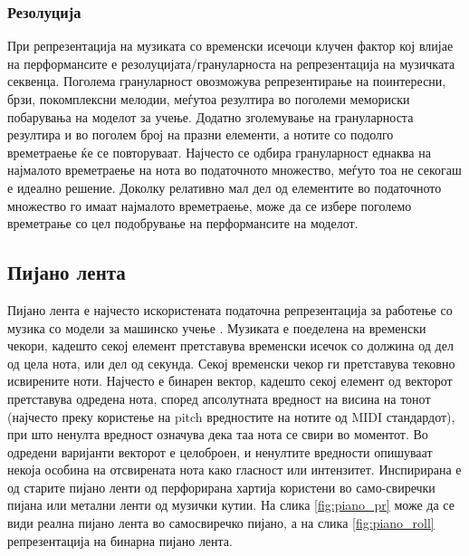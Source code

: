 \subsubsection{Резолуција}

При репрезентација на музиката со временски исечоци клучен фактор кој влијае на перформансите е резолуцијата/грануларноста на репрезентација на музичката секвенца. Поголема грануларност овозможува репрезентирање на поинтересни, брзи, покомплексни мелодии, меѓутоа резултира во поголеми мемориски побарувања на моделот за учење. Додатно зголемување на грануларноста резултира и во поголем број на празни елементи, а нотите со подолго времетраење ќе се повторуваат. Најчесто се одбира грануларност еднаква на најмалото времетраење на нота во податочното множество, меѓуто тоа не секогаш е идеално решение. Доколку релативно мал дел од елементите во податочното множество го имаат најмалото времетраење, може да се избере поголемо времетрање со цел подобрување на перформансите на моделот.

\subsection{Пијано лента}

Пијано лента е најчесто искористената податочна репрезентација за работење со музика со модели за машинско учење \cite{Hadjeres2016,Boulanger-Lewandowski2012,Boulanger-Lewandowski2014,Eck2002,Eck2008,Walder2016,Dong2017,Dong2018}. Музиката е поеделена на временски чекори, кадешто секој елемент претставува временски исечок со должина од дел од цела нота, или дел од секунда. Секој временски чекор ги претставува тековно исвирените ноти. Најчесто е бинарен вектор, кадешто секој елемент од векторот претставува одредена нота, според апсолутната вредност на висина на тонот (најчесто преку користење на pitch вредностите на нотите од MIDI стандардот), при што ненулта вредност означува дека таа нота се свири во моментот. Во одредени варијанти векторот е целоброен, и ненултите вредности опишуваат некоја особина на отсвирената нота како гласност или интензитет. Инспирирана е од старите пијано ленти од перфорирана хартија користени во само-свиречки пијана или метални ленти од музички кутии. На слика \ref{fig:piano_pr} може да се види реална пијано лента во самосвиречко пијано, а на слика \ref{fig:piano_roll} репрезентација на бинарна пијано лента.

